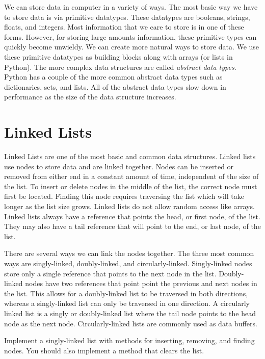 \label{lab:Python_DataStructures}

We can store data in computer in a variety of ways.
The most basic way we have to store data is via primitive datatypes.
These datatypes are booleans, strings, floats, and integers.
Most information that we care to store is in one of these forms.
However, for storing large amounts information, these primitive types can quickly become unwieldy.
We can create more natural ways to store data.  We use these primitive datatypes as building blocks along with arrays (or lists in Python).  
The more complex data structures are called \emph{abstract data types}.
Python has a couple of the more common abstract data types such as dictionaries, sets, and lists.
All of the abstract data types slow down in performance as the size of the data structure increases.  

\section*{Linked Lists}
Linked Lists are one of the most basic and common data structures.
Linked lists use nodes to store data and are linked together.
Nodes can be inserted or removed from either end in a constant amount of time, independent of the size of the list.
To insert or delete nodes in the middle of the list, the correct node must first be located.  
Finding this node requires traversing the list which will take longer as the list size grows.  
Linked lists do not allow random access like arrays.  
Linked lists always have a reference that points the head, or first node, of the list.  
They may also have a tail reference that will point to the end, or last node, of the list.

There are several ways we can link the nodes together.  The three most common ways are singly-linked, doubly-linked, and circularly-linked.  
Singly-linked nodes store only a single reference that points to the next node in the list.  
Doubly-linked nodes have two references that point point the previous and next nodes in the list.  
This allows for a doubly-linked list to be traversed in both directions, whereas a singly-linked list can only be traversed in one direction. 
A circularly linked list is a singly or doubly-linked list where the tail node points to the head node as the next node.  
Circularly-linked lists are commonly used as data buffers.

\begin{problem}
Implement a singly-linked list with methods for inserting, removing, and finding nodes.  You should also implement a method that clears the list.
\end{problem}

